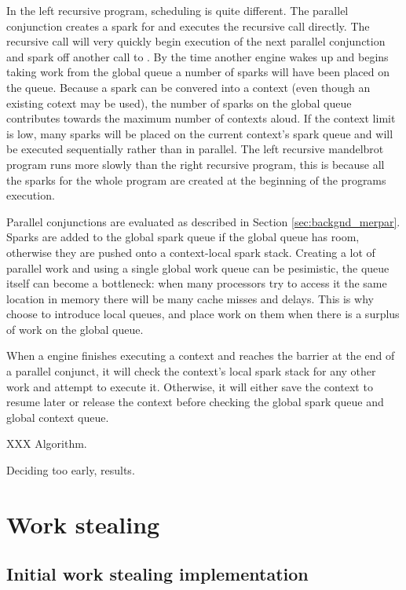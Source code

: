 In the left recursive program,
scheduling is quite different.
The parallel conjunction creates a spark for  and executes the
recursive call directly.
The recursive call will very quickly begin execution of the next parallel
conjunction and spark off another call to .
By the time another engine wakes up and begins taking work from the global
queue a number of sparks will have been placed on the queue.
Because a spark can be convered into a context (even though an existing
cotext may be used),
the number of sparks on the global queue contributes towards the maximum
number of contexts aloud.
If the context limit is low, many sparks will be placed on the current
context's spark queue and will be executed sequentially rather than in
parallel.
The left recursive mandelbrot program runs more slowly than the right
recursive program,
this is because all the sparks for the whole program are created at the
beginning of the programs execution.



Parallel conjunctions are evaluated as described in Section
\ref{sec:backgnd_merpar}.
Sparks are added to the global spark queue if the global queue has room,
otherwise they are pushed onto a context-local spark stack.
Creating a lot of parallel work and using a single global work queue can be
pesimistic,
the queue itself can become a bottleneck:
when many processors try to access it the same location in memory there will
be many cache misses and delays.
This is why \citet{wang_hons_thesis} choose to introduce local queues,
and place work on them when there is a surplus of work on the global queue.

When a engine finishes executing a context and reaches the barrier at the
end of a parallel conjunct,
it will check the context's local spark stack for any other work and attempt
to execute it.
Otherwise, it will either save the context to resume later or release the
context before checking the global spark queue and global context queue.

XXX Algorithm.

Deciding too early, results.


\section{Work stealing}

\subsection{Initial work stealing implementation}

